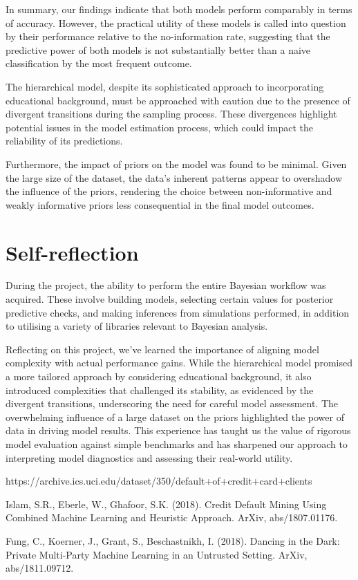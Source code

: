 \documentclass[a4paper]{artikel3}
\begin{document}
In summary, our findings indicate that both models perform comparably in terms of accuracy. However, the practical utility of these models is called into question by their performance relative to the no-information rate, suggesting that the predictive power of both models is not substantially better than a naive classification by the most frequent outcome.

The hierarchical model, despite its sophisticated approach to incorporating educational background, must be approached with caution due to the presence of divergent transitions during the sampling process. These divergences highlight potential issues in the model estimation process, which could impact the reliability of its predictions.

Furthermore, the impact of priors on the model was found to be minimal. Given the large size of the dataset, the data's inherent patterns appear to overshadow the influence of the priors, rendering the choice between non-informative and weakly informative priors less consequential in the final model outcomes.

\section{Self-reflection}

During the project, the ability to perform the entire Bayesian workflow was acquired. These involve building models, selecting certain values for posterior predictive checks, and making inferences from simulations performed, in addition to utilising a variety of libraries relevant to Bayesian analysis.

Reflecting on this project, we’ve learned the importance of aligning model complexity with actual performance gains. While the hierarchical model promised a more tailored approach by considering educational background, it also introduced complexities that challenged its stability, as evidenced by the divergent transitions, underscoring the need for careful model assessment. The overwhelming influence of a large dataset on the priors highlighted the power of data in driving model results. This experience has taught us the value of rigorous model evaluation against simple benchmarks and has sharpened our approach to interpreting model diagnostics and assessing their real-world utility.


\begin{thebibliography}{9}
https://archive.ics.uci.edu/dataset/350/default+of+credit+card+clients

Islam, S.R., Eberle, W.,  Ghafoor, S.K. (2018). Credit Default Mining Using Combined Machine Learning and Heuristic Approach. ArXiv, abs/1807.01176.

Fung, C., Koerner, J., Grant, S., Beschastnikh, I. (2018). Dancing in the Dark: Private Multi-Party Machine Learning in an Untrusted Setting. ArXiv, abs/1811.09712.

\end{thebibliography}
\end{document}
